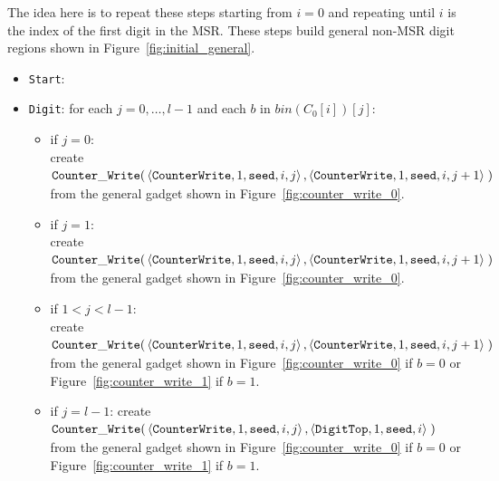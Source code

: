 The idea here is to repeat these steps starting from $i = 0$ and repeating until $i$ is the index of the first digit in the MSR. These
steps build general non-MSR digit regions shown in Figure~\ref{fig:initial_general}.


\begin{itemize}
    \item {\tt Start}:

    \item {\tt Digit}: for each $j=0,\ldots,l-1$ and each $b$ in $bin(C_0[i])[j]$:
    \begin{itemize}
        \item if $j = 0$:\\ create
        $\begin{aligned}[t]
            {\tt Counter\_Write}(&\left\langle {\tt CounterWrite}, 1, {\tt seed}, i, j \right\rangle, \left\langle {\tt CounterWrite}, 1, {\tt seed}, i, j + 1 \right\rangle \;)
        \end{aligned}$\\from the general gadget shown in Figure~\ref{fig:counter_write_0}.

        \item if $j = 1$:\\ create
        $\begin{aligned}[t]
            {\tt Counter\_Write}(&\left\langle {\tt CounterWrite}, 1, {\tt seed}, i, j \right\rangle, \left\langle {\tt CounterWrite}, 1, {\tt seed}, i, j + 1 \right\rangle \;)
        \end{aligned}$\\from the general gadget shown in Figure~\ref{fig:counter_write_0}.

        \item if $1 < j < l-1$:\\ create
        $\begin{aligned}[t]
            {\tt Counter\_Write}(&\left\langle {\tt CounterWrite}, 1, {\tt seed}, i, j \right\rangle, \left\langle {\tt CounterWrite}, 1, {\tt seed}, i, j + 1 \right\rangle \;)
        \end{aligned}$\\from the general gadget shown in Figure~\ref{fig:counter_write_0} if $b = 0$ or Figure~\ref{fig:counter_write_1} if $b = 1$.

        \item if $j = l-1$: create
        $\begin{aligned}[t]
            {\tt Counter\_Write}(&\left\langle {\tt CounterWrite}, 1, {\tt seed}, i, j \right\rangle, \left\langle {\tt DigitTop}, 1, {\tt seed}, i \right\rangle \;)
        \end{aligned}$\\from the general gadget shown in Figure~\ref{fig:counter_write_0} if $b = 0$ or Figure~\ref{fig:counter_write_1} if $b = 1$.
    \end{itemize}



\end{itemize}
